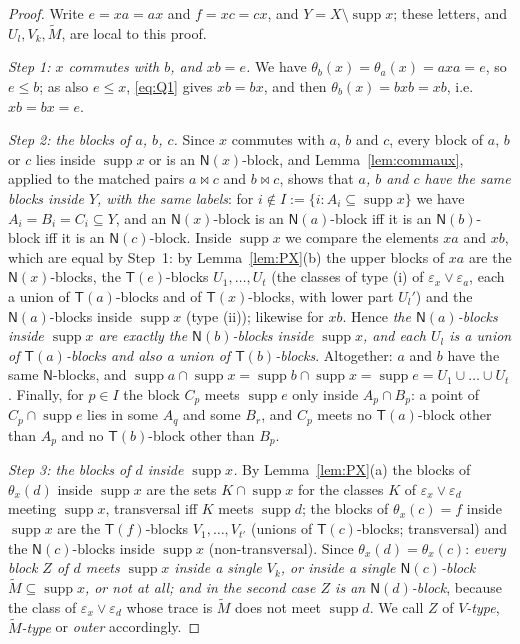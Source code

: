 \documentclass[11pt]{amsart}
\theoremstyle{definition}
\newcommand{\supp}{\operatorname{supp}}
\newcommand{\T}{\mathsf{T}}
\newcommand{\N}{\mathsf{N}}
\newcommand{\mt}{\bowtie}      %
\begin{document}
\begin{proof}
Write $e=xa=ax$ and $f=xc=cx$, and $Y=X\setminus\supp x$; these letters, and $U_l,V_k,\tilde M$, are local to this proof.

\smallskip
\emph{Step 1: $x$ commutes with $b$, and $xb=e$.} We have $\theta_b(x)=\theta_a(x)=axa=e$, so $e\le b$; as also $e\le x$, \eqref{eq:Q1} gives $xb=bx$, and then $\theta_b(x)=bxb=xb$, i.e.\ $xb=bx=e$.

\smallskip
\emph{Step 2: the blocks of $a$, $b$, $c$.} Since $x$ commutes with $a$, $b$ and $c$, every block of $a$, $b$ or $c$ lies inside $\supp x$ or is an $\N(x)$-block, and Lemma~\ref{lem:commaux}, applied to the matched pairs $a\mt c$ and $b\mt c$, shows that \emph{$a$, $b$ and $c$ have the same blocks inside $Y$, with the same labels}: for $i\notin I:=\{i:A_i\subseteq\supp x\}$ we have $A_i=B_i=C_i\subseteq Y$, and an $\N(x)$-block is an $\N(a)$-block iff it is an $\N(b)$-block iff it is an $\N(c)$-block. Inside $\supp x$ we compare the elements $xa$ and $xb$, which are equal by Step~1: by Lemma~\ref{lem:PX}(b) the upper blocks of $xa$ are the $\N(x)$-blocks, the $\T(e)$-blocks $U_1,\dots,U_t$ (the classes of type (i) of $\varepsilon_x\vee\varepsilon_a$, each a union of $\T(a)$-blocks and of $\T(x)$-blocks, with lower part $U_l'$) and the $\N(a)$-blocks inside $\supp x$ (type (ii)); likewise for $xb$. Hence \emph{the $\N(a)$-blocks inside $\supp x$ are exactly the $\N(b)$-blocks inside $\supp x$, and each $U_l$ is a union of $\T(a)$-blocks and also a union of $\T(b)$-blocks}. Altogether: $a$ and $b$ have the same $\N$-blocks, and $\supp a\cap\supp x=\supp b\cap\supp x=\supp e=U_1\cup\dots\cup U_t$. Finally, for $p\in I$ the block $C_p$ meets $\supp e$ only inside $A_p\cap B_p$: a point of $C_p\cap\supp e$ lies in some $A_q$ and some $B_r$, and $C_p$ meets no $\T(a)$-block other than $A_p$ and no $\T(b)$-block other than $B_p$.

\smallskip
\emph{Step 3: the blocks of $d$ inside $\supp x$.} By Lemma~\ref{lem:PX}(a) the blocks of $\theta_x(d)$ inside $\supp x$ are the sets $K\cap\supp x$ for the classes $K$ of $\varepsilon_x\vee\varepsilon_d$ meeting $\supp x$, transversal iff $K$ meets $\supp d$; the blocks of $\theta_x(c)=f$ inside $\supp x$ are the $\T(f)$-blocks $V_1,\dots,V_{t'}$ (unions of $\T(c)$-blocks; transversal) and the $\N(c)$-blocks inside $\supp x$ (non-transversal). Since $\theta_x(d)=\theta_x(c)$: \emph{every block $Z$ of $d$ meets $\supp x$ inside a single $V_k$, or inside a single $\N(c)$-block $\tilde M\subseteq\supp x$, or not at all; and in the second case $Z$ is an $\N(d)$-block}, because the class of $\varepsilon_x\vee\varepsilon_d$ whose trace is $\tilde M$ does not meet $\supp d$. We call $Z$ of \emph{$V$-type}, \emph{$\tilde M$-type} or \emph{outer} accordingly.


\end{proof}
\end{document}
